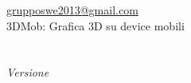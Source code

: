 \documentclass[a4paper]{article}
\begin{document}
\thispagestyle{empty}
\begin{center}\centerline{
}
{\href{mailto:grupposwe2013@gmail.com}{\color[rgb]{0.39,0.37,0.38}grupposwe2013@gmail.com}}\\ [3pc]
{\Huge {3DMob: Grafica 3D su device mobili}}\\[.5pc]
\underline{\hspace{6in}}\\[3pc]
{\Huge {\TipoDocumento}}\\[1pc]
{\emph{Versione \Versione}}\\
\end{center}
\vspace{.3in}
\end{document}
